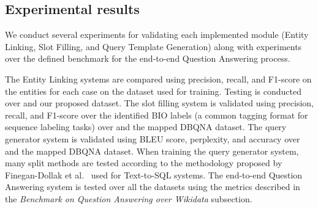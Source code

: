 \subsection*{Experimental results}
\label{cap1:intro/contributions/expResults}
We conduct several experiments for validating each implemented module (Entity Linking, 
Slot Filling, and Query Template Generation) along with experiments over the defined 
benchmark for the end-to-end Question Answering process.

The Entity Linking systems are compared using precision, recall, and F1-score on the 
entities for each case on the dataset used for training. Testing is conducted over \QALDseven{} and 
our proposed dataset. The slot filling system is validated using precision, recall, and F1-score 
over the identified BIO labels (a common tagging format for sequence labeling tasks) over 
\LCQuADtwo{} and the mapped DBQNA dataset. The query generator system is validated 
using BLEU score, perplexity, and accuracy over \LCQuADtwo{} and the mapped DBQNA 
dataset. When training the query generator system, many split methods are tested according 
to the methodology proposed by Finegan-Dollak et al.~\cite{semPar:txt-to-sql-RadevKZZFRS18} used for Text-to-SQL systems. 
The end-to-end Question Answering system is tested over all the datasets using the metrics 
described in the \textit{Benchmark on Question Answering over Wikidata} subsection.